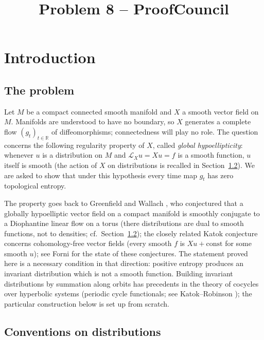 \documentclass[12pt]{article}
\title{Problem 8 -- ProofCouncil}
\author{}
\date{}
\theoremstyle{remark}
\newcommand{\R}{\mathbb R}
\newcommand{\LX}{\mathcal L_X}
\begin{document}
\maketitle

\section{Introduction}
\label{sec:intro}

\subsection{The problem}

Let \(M\) be a compact connected smooth manifold and \(X\) a smooth
vector field on \(M\).  Manifolds are understood to have no
boundary, so \(X\) generates a complete flow \((g_t)_{t\in\R}\) of
diffeomorphisms; connectedness will play no role.  The question concerns the following regularity
property of \(X\), called \emph{global hypoellipticity}: whenever
\(u\) is a distribution on \(M\) and \(\LX u=Xu=f\) is a smooth
function, \(u\) itself is smooth (the action of \(X\) on
distributions is recalled in Section~\ref{sec:conventions}).  We are
asked to show that under this hypothesis every time map \(g_t\) has
zero topological entropy.

The property goes back to Greenfield and Wallach
\cite{GreenfieldWallach1973}, who conjectured that a globally
hypoelliptic vector field on a compact manifold is smoothly conjugate
to a Diophantine linear flow on a torus (there distributions are
dual to smooth functions, not to densities; cf.\
Section~\ref{sec:conventions}); the closely related Katok
conjecture concerns cohomology-free vector fields (every smooth
\(f\) is \(Xu+\mathrm{const}\) for some smooth \(u\)); see Forni
\cite{Forni2008} for the state of these conjectures.
The statement proved here is a necessary condition in that direction:
positive entropy produces an invariant distribution which is not a
smooth function.
Building invariant distributions by summation along orbits has
precedents in the theory of cocycles over hyperbolic systems
(periodic cycle functionals; see Katok--Robinson
\cite{KatokRobinson2001}); the particular construction below is set
up from scratch.

\subsection{Conventions on distributions}
\label{sec:conventions}
\end{document}
